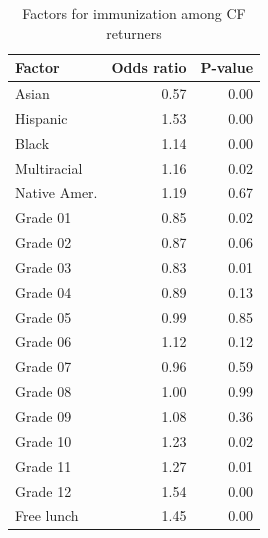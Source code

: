 \documentclass{article}
\begin{document}
\begin{multicols}{2}
\begin{table}[H]
\begin{table}[ht]
\centering
{\small
\begin{tabular}{lrr}
  \hline
Factor & Odds ratio & P-value \\ 
  \hline
Asian & 0.57 & 0.00 \\ 
  Hispanic & 1.53 & 0.00 \\ 
  Black & 1.14 & 0.00 \\ 
  Multiracial & 1.16 & 0.02 \\ 
  Native Amer. & 1.19 & 0.67 \\ 
  Grade 01 & 0.85 & 0.02 \\ 
  Grade 02 & 0.87 & 0.06 \\ 
  Grade 03 & 0.83 & 0.01 \\ 
  Grade 04 & 0.89 & 0.13 \\ 
  Grade 05 & 0.99 & 0.85 \\ 
  Grade 06 & 1.12 & 0.12 \\ 
  Grade 07 & 0.96 & 0.59 \\ 
  Grade 08 & 1.00 & 0.99 \\ 
  Grade 09 & 1.08 & 0.36 \\ 
  Grade 10 & 1.23 & 0.02 \\ 
  Grade 11 & 1.27 & 0.01 \\ 
  Grade 12 & 1.54 & 0.00 \\ 
  Free lunch & 1.45 & 0.00 \\ 
   \hline
\end{tabular}
}
\caption{Factors for immunization among CF returners} 
\end{table}\end{table}

\end{multicols}


\end{document}
